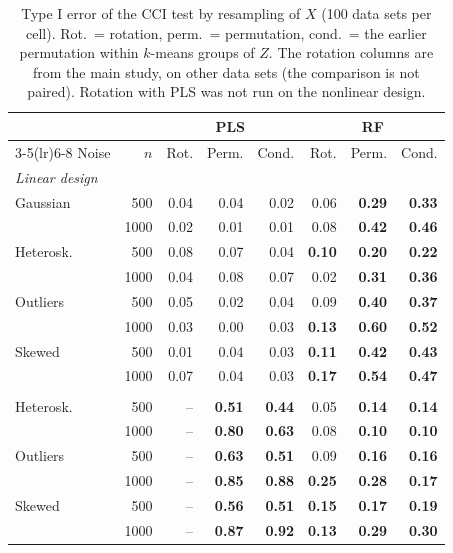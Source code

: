 \documentclass[10pt,leqno]{amsart}
\newcommand{\hi}[1]{\textbf{#1}}            %
\begin{document}
\begin{table}[H]
\caption{Type I error of the CCI test by resampling of $X$ (100 data sets per cell). Rot.\ = rotation, perm.\ = permutation, cond.\ = the earlier permutation within $k$-means groups of $Z$. The rotation columns are from the main study, on other data sets (the comparison is not paired). Rotation with PLS was not run on the nonlinear design.}
\label{tab:resampling}
\footnotesize
\setlength{\tabcolsep}{4pt}
\begin{tabular}{lrrrrrrr}
\toprule
 & & \multicolumn{3}{c}{PLS} & \multicolumn{3}{c}{RF} \\
\cmidrule(lr){3-5}\cmidrule(lr){6-8}
Noise & $n$ & Rot. & Perm. & Cond. & Rot. & Perm. & Cond. \\
\midrule
\multicolumn{8}{l}{\emph{Linear design}} \\
Gaussian & 500 & 0.04 & 0.04 & 0.02 & 0.06 & \hi{0.29} & \hi{0.33} \\
 & 1000 & 0.02 & 0.01 & 0.01 & 0.08 & \hi{0.42} & \hi{0.46} \\
Heterosk. & 500 & 0.08 & 0.07 & 0.04 & \hi{0.10} & \hi{0.20} & \hi{0.22} \\
 & 1000 & 0.04 & 0.08 & 0.07 & 0.02 & \hi{0.31} & \hi{0.36} \\
Outliers & 500 & 0.05 & 0.02 & 0.04 & 0.09 & \hi{0.40} & \hi{0.37} \\
 & 1000 & 0.03 & 0.00 & 0.03 & \hi{0.13} & \hi{0.60} & \hi{0.52} \\
Skewed & 500 & 0.01 & 0.04 & 0.03 & \hi{0.11} & \hi{0.42} & \hi{0.43} \\
 & 1000 & 0.07 & 0.04 & 0.03 & \hi{0.17} & \hi{0.54} & \hi{0.47} \\
\addlinespace
\multicolumn{8}{l}{\emph{Nonlinear design}} \\
Heterosk. & 500 & -- & \hi{0.51} & \hi{0.44} & 0.05 & \hi{0.14} & \hi{0.14} \\
 & 1000 & -- & \hi{0.80} & \hi{0.63} & 0.08 & \hi{0.10} & \hi{0.10} \\
Outliers & 500 & -- & \hi{0.63} & \hi{0.51} & 0.09 & \hi{0.16} & \hi{0.16} \\
 & 1000 & -- & \hi{0.85} & \hi{0.88} & \hi{0.25} & \hi{0.28} & \hi{0.17} \\
Skewed & 500 & -- & \hi{0.56} & \hi{0.51} & \hi{0.15} & \hi{0.17} & \hi{0.19} \\
 & 1000 & -- & \hi{0.87} & \hi{0.92} & \hi{0.13} & \hi{0.29} & \hi{0.30} \\
\bottomrule
\end{tabular}
\end{table}
\end{document}
